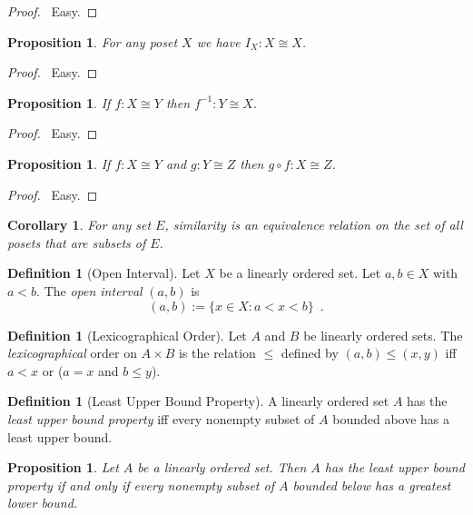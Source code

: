 \documentclass{report}
\let\qed\relax
\newtheorem{prop}[ax]{Proposition}
\newtheorem{cor}{Corollary}[ax]
\theoremstyle{definition}
\newtheorem{df}[ax]{Definition}
\begin{document}
\begin{proof}
\pf\ Easy. \qed
\end{proof}

\begin{prop}
For any poset $X$ we have $I_X : X \cong X$.
\end{prop}

\begin{proof}
\pf\ Easy. \qed
\end{proof}

\begin{prop}
If $f : X \cong Y$ then $f^{-1} : Y \cong X$.
\end{prop}

\begin{proof}
\pf\ Easy. \qed
\end{proof}

\begin{prop}
If $f : X \cong Y$ and $g : Y \cong Z$ then $g \circ f : X \cong Z$.
\end{prop}

\begin{proof}
\pf\ Easy. \qed
\end{proof}

\begin{cor}
For any set $E$, similarity is an equivalence relation on the set of all posets that are subsets of $E$.
\end{cor}

\begin{df}[Open Interval]
Let $X$ be a linearly ordered set. Let $a,b \in X$ with $a < b$. The \emph{open interval} $(a,b)$ is
\[ (a,b) := \{ x \in X : a < x < b \} \enspace . \]
\end{df}

\begin{df}[Lexicographical Order]
Let $A$ and $B$ be linearly ordered sets.
The \emph{lexicographical} order on $A \times B$ is the relation $\leq$ defined by $(a,b) \leq (x,y)$ iff $a < x$ or ($a = x$ and $b \leq y$).
\end{df}

\begin{df}[Least Upper Bound Property]
A linearly ordered set $A$ has the \emph{least upper bound property} iff every nonempty subset of $A$ bounded above has a least upper bound.
\end{df}

\begin{prop}
Let $A$ be a linearly ordered set. Then $A$ has the least upper bound property if and only if every nonempty subset of $A$ bounded below has a greatest lower bound.
\end{prop}
\end{document}
